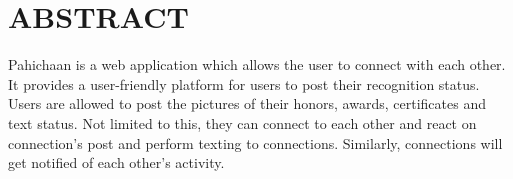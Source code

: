 \section*{\center ABSTRACT}


Pahichaan is a web application which allows the user to connect with each
other. It provides a user-friendly platform for users to post their recognition status. Users are allowed to post the pictures of their honors, awards, certificates and text status. Not limited to this, they can connect to each other and react on connection’s post and perform texting to connections. Similarly, connections will get notified of each other’s activity.